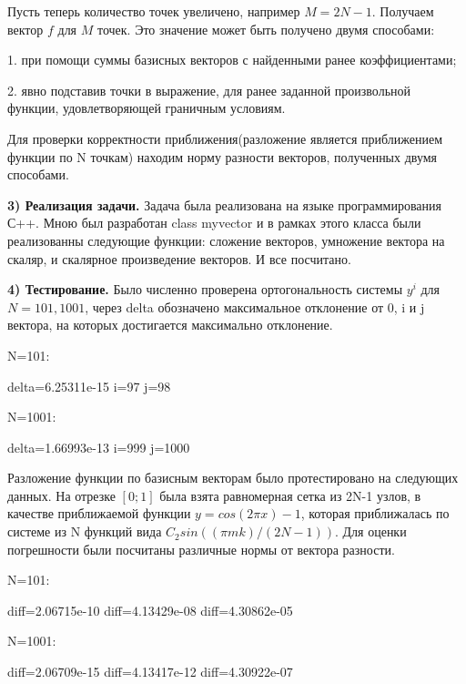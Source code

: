 \documentclass[12pt,a4paper]{scrartcl}
\begin{document}
Пусть теперь количество точек увеличено, например $M = 2N-1$. Получаем вектор $f$ для $M$ точек. Это значение может быть получено двумя способами:

1. при помощи суммы базисных векторов с найденными ранее коэффициентами;

2. явно подставив точки в выражение, для ранее заданной произвольной функции, удовлетворяющей граничным условиям.

Для проверки корректности приближения(разложение является приближением функции по N точкам) находим норму разности векторов, полученных двумя способами.

\textbf{3) Реализация задачи.}
Задача была реализована на языке программирования С++. Мною был разработан class myvector и в рамках этого класса были реализованны следующие функции: сложение векторов, умножение вектора на скаляр, и скалярное произведение векторов. И все посчитано.

\textbf{4) Тестирование.}
Было численно проверена ортогональность системы $y^i$ для $N=101,1001$, через delta обозначено максимальное отклонение от 0, i и j вектора, на которых достигается максимально отклонение.

N=101:

delta=6.25311e-15 i=97 j=98

N=1001:

delta=1.66993e-13 i=999 j=1000

Разложение функции по базисным векторам было протестировано на следующих данных. На отрезке $[0;1]$ была взята равномерная сетка из 2N-1 узлов, в качестве приближаемой функции $y=cos(2\pi x) - 1$, которая приближалась по системе из N функций вида $C_2 sin ((\pi m k)/(2N-1))$. Для оценки погрешности были посчитаны различные нормы от вектора разности.

N=101:

diff=2.06715e-10 diff=4.13429e-08 diff=4.30862e-05

N=1001:

diff=2.06709e-15 diff=4.13417e-12 diff=4.30922e-07
\end{document}
